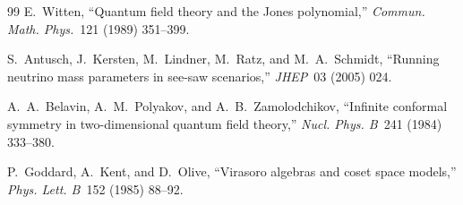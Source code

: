 \documentclass[11pt]{article}
\begin{document}
\begin{thebibliography}{99}
E.~Witten,
``Quantum field theory and the Jones polynomial,''
\emph{Commun. Math. Phys.}~121 (1989) 351--399.

S.~Antusch, J.~Kersten, M.~Lindner, M.~Ratz, and M.~A.~Schmidt,
``Running neutrino mass parameters in see-saw scenarios,''
\emph{JHEP}~03 (2005) 024.

A.~A.~Belavin, A.~M.~Polyakov, and A.~B.~Zamolodchikov,
``Infinite conformal symmetry in two-dimensional quantum field theory,''
\emph{Nucl. Phys. B}~241 (1984) 333--380.

P.~Goddard, A.~Kent, and D.~Olive,
``Virasoro algebras and coset space models,''
\emph{Phys. Lett. B}~152 (1985) 88--92.

\end{thebibliography}
\end{document}
